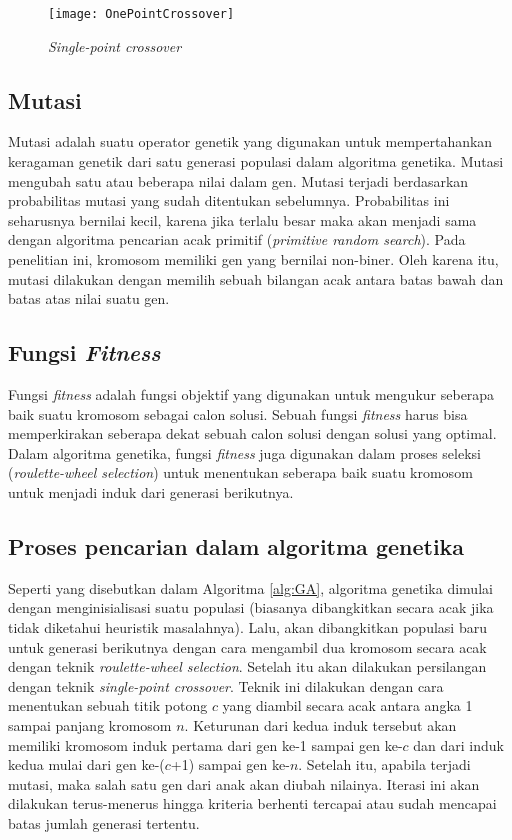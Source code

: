 \begin{figure}[h]
	\begin{center}
		\texttt{[image: OnePointCrossover]}
		\caption{\textit{Single-point crossover}}
		\label{fig:spcrossover}
	\end{center}
\end{figure}

\subsection{Mutasi}
\label{sub:mutation}
Mutasi adalah suatu operator genetik yang digunakan untuk mempertahankan keragaman genetik dari satu generasi populasi dalam algoritma genetika. Mutasi mengubah satu atau beberapa nilai dalam gen. Mutasi terjadi berdasarkan probabilitas mutasi yang sudah ditentukan sebelumnya. Probabilitas ini seharusnya bernilai kecil, karena jika terlalu besar maka akan menjadi sama dengan algoritma pencarian acak primitif (\textit{primitive random search}). Pada penelitian ini, kromosom memiliki gen yang bernilai non-biner. Oleh karena itu, mutasi dilakukan dengan memilih sebuah bilangan acak antara batas bawah dan batas atas nilai suatu gen.

\subsection{Fungsi \textit{Fitness}}
\label{sub:fitnessFn}
Fungsi \textit{fitness} adalah fungsi objektif yang digunakan untuk mengukur seberapa baik suatu kromosom sebagai calon solusi. Sebuah fungsi \textit{fitness} harus bisa memperkirakan seberapa dekat sebuah calon solusi dengan solusi yang optimal. Dalam algoritma genetika, fungsi \textit{fitness} juga digunakan dalam proses seleksi (\textit{roulette-wheel selection}) untuk menentukan seberapa baik suatu kromosom untuk menjadi induk dari generasi berikutnya.

\subsection{Proses pencarian dalam algoritma genetika}
Seperti yang disebutkan dalam Algoritma \ref{alg:GA}, algoritma genetika dimulai dengan menginisialisasi suatu populasi (biasanya dibangkitkan secara acak jika tidak diketahui heuristik masalahnya). Lalu, akan dibangkitkan populasi baru untuk generasi berikutnya dengan cara mengambil dua kromosom secara acak dengan teknik \textit{roulette-wheel selection}. Setelah itu akan dilakukan persilangan dengan teknik \textit{single-point crossover}. Teknik ini dilakukan dengan cara menentukan sebuah titik potong $c$ yang diambil secara acak antara angka 1 sampai panjang kromosom $n$. Keturunan dari kedua induk tersebut akan memiliki kromosom induk pertama dari gen ke-1 sampai gen ke-$c$ dan dari induk kedua mulai dari gen ke-($c$+1) sampai gen ke-$n$. Setelah itu, apabila terjadi mutasi, maka salah satu gen dari anak akan diubah nilainya. Iterasi ini akan dilakukan terus-menerus hingga kriteria berhenti tercapai atau sudah mencapai batas jumlah generasi tertentu.


